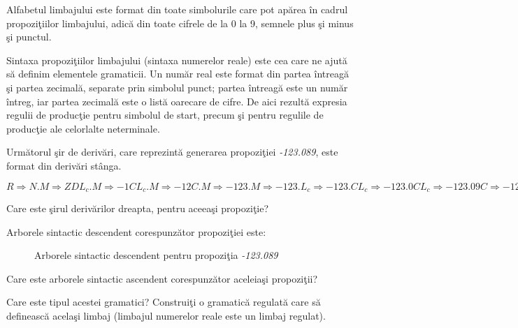 Alfabetul limbajului este format din toate simbolurile care pot apărea în cadrul propoziţiilor limbajului, adică din toate cifrele de la 0 la 9, semnele plus şi minus şi punctul.

Sintaxa propoziţiilor limbajului (sintaxa numerelor reale) este cea care ne ajută să definim elementele gramaticii. Un număr real este format din partea întreagă şi partea zecimală, separate prin simbolul punct; partea întreagă este un număr întreg, iar partea zecimală este o listă oarecare de cifre. De aici rezultă expresia regulii de producţie pentru simbolul de start, precum şi pentru regulile de producţie ale celorlalte neterminale.

Următorul şir de derivări, care reprezintă generarea propoziţiei \textit{-123.089}, este format din derivări stânga.

$ R \Rightarrow N.M  \Rightarrow ZDL_c.M  \Rightarrow -1CL_c.M \Rightarrow -12C.M \Rightarrow -123.M \Rightarrow-123.L_c \Rightarrow -123.CL_c \Rightarrow -123.0CL_c \Rightarrow-123.09C \Rightarrow -123.098$ 

Care este şirul derivărilor dreapta, pentru aceeaşi propoziţie?

Arborele sintactic descendent corespunzător propoziţiei este:

\begin{figure}[H]
\centering
{} 
\caption{Arborele sintactic descendent pentru propoziţia \textit{-123.089}}
\end{figure}

Care este arborele sintactic ascendent corespunzător aceleiaşi propoziţii?

Care este tipul acestei gramatici? Construiţi o gramatică regulată care să definească acelaşi limbaj (limbajul numerelor reale este un limbaj regulat).

